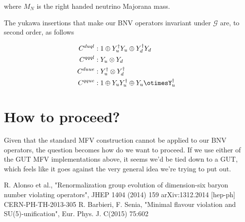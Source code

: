 \documentclass[aps,onecolumn,twoside,secnumarabic,balancelastpage,amsmath,amssymb,nofootinbib,hyperref=pdftex]{revtex4}
\begin{document}
where $M_{N}$ is the right handed neutrino Majorana mass.

The yukawa insertions that make our BNV operators invariant under $\mathcal{G}$ are, to second order, as follows

\begin{align}
C^{duql} &: 1 \oplus Y^{\dagger}_{u}Y_{u} \oplus Y_{d}^{\dagger}Y_{d}\\
C^{qqql} &: Y_{u} \otimes Y_{d}\\
C^{duue} &: Y^{\dagger}_{u} \otimes Y_{d}^{\dagger}\\
C^{qque} &: 1 \oplus Y_{u}Y_{u}^{\dagger} \oplus Y_{u}\otimesY^{\dagger}_{u}\\
\end{align} 


\section{How to proceed?}
Given that the standard MFV construction cannot be applied to our BNV operators, the question becomes how do we want to proceed. If we use either of the GUT MFV implementations above, it seems we'd be tied down to a GUT, which feels like it goes against the very general idea we're trying to put out.  

\begin{thebibliography}{9}

R. Alonso et al.,  "Renormalization group evolution of dimension-six
baryon number violating operators", JHEP 1404 (2014) 159 arXiv:1312.2014 [hep-ph] CERN-PH-TH-2013-305
R. Barbieri, F. Senia, "Minimal flavour violation and SU(5)-unification", Eur. Phys. J. C(2015) 75:602

\end{thebibliography}
\end{document}
